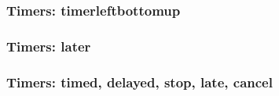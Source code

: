 \documentclass{article}
\begin{document}
{
\begin{pktxdiag}[]
\testx
\end{pktxdiag}
\hfill
\begin{pktxdiag}[]
\testxi
\end{pktxdiag}

\begin{hpktxdiag}
\testx
\end{hpktxdiag}

\bigskip

\begin{hpktxdiag}
\testxi
\end{hpktxdiag}
}

\subsubsection*{Timers: timerleftbottomup}

{
\begin{pktxdiag}[]
\testx
\end{pktxdiag}
\hfill
\begin{pktxdiag}[]
\testxi
\end{pktxdiag}

\begin{hpktxdiag}
\testx
\end{hpktxdiag}

\bigskip

\begin{hpktxdiag}
\testxi
\end{hpktxdiag}
}
\vfill

\subsubsection*{Timers: later}

\begin{pktxdiag}
  \testlatertimer
\end{pktxdiag}
\begin{pktxdiag}[timerleftbelow]
  \testlatertimer
\end{pktxdiag}
\begin{pktxdiag}[timerleftbottomup]
  \testlatertimer
\end{pktxdiag}
\begin{pktxdiag}
  \testlatertimeri
\end{pktxdiag}


\subsubsection*{Timers: timed, delayed, stop, late, cancel}
\end{document}
